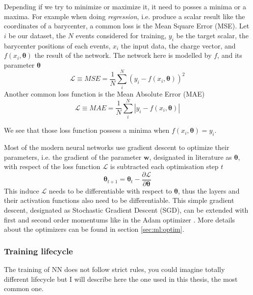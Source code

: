 \documentclass[../main.tex]{subfiles}
\begin{document}
Depending if we try to minimize or maximize it, it need to posses a minima or a maxima. For example when doing \textit{regression}, i.e. produce a scalar result like the coordinates of a barycenter, a common loss is the Mean Square Error (MSE). Let $i$ be our dataset, the $N$ events considered for training, $y_i$ be the target scalar, the barycenter positions of each events, $x_i$ the input data, the charge vector, and $f(x_i, \bm{\theta})$ the result of the network. The network here is modelled by $f$, and its parameter $\bm{\theta}$
\begin{equation}
  \mathcal{L} \equiv MSE = \frac{1}{N} \sum_i^N (y_i - f(x_i, \bm{\theta}))^2
\end{equation}
Another common loss function is the Mean Absolute Error (MAE)
\begin{equation}
  \mathcal{L} \equiv MAE = \frac{1}{N} \sum_i^N |y_i - f(x_i, \bm{\theta})|
\end{equation}

We see that those loss function possess a minima when $f(x_i, \bm{\theta}) = y_i$.


Most of the modern neural networks use gradient descent to optimize their parameters, i.e. the gradient of the parameter $\bm{w}$, designated in literature as $\bm{\theta}$, with respect of the loss function $\mathcal{L}$ is subtracted each optimisation step $t$
\begin{equation}
  \bm{\theta}_{t+1} = \bm{\theta}_t - \frac{\partial \mathcal{L}}{\partial \bm{\theta}}
\end{equation}
This induce $\mathcal{L}$  needs to be differentiable with respect to $\bm{\theta}$, thus the layers and their activation functions also need to be differentiable. This simple gradient descent, designated as Stochastic Gradient Descent (SGD), can be extended with first and second order momentums like in the Adam optimizer \cite{kingma_adam_2017}. More details about the optimizers can be found in section \ref{sec:ml:optim}.

\subsubsection{Training lifecycle}

The training of NN does not follow strict rules, you could imagine totally different lifecycle but I will describe here the one used in this thesis, the most common one.
\end{document}
